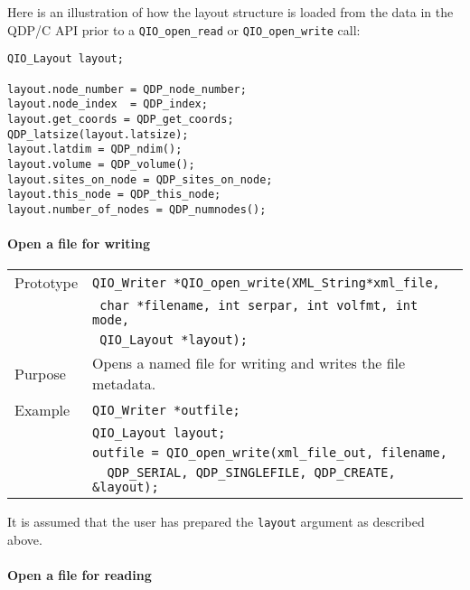 \documentclass{article}
\newcommand{\QMDhandle}{{\tt XML\_String}}
\begin{document}
Here is an illustration of how the layout structure is loaded from the
data in the QDP/C API prior to a \verb|QIO_open_read| or
\verb|QIO_open_write| call:
%
\begin{verbatim}
QIO_Layout layout;

layout.node_number = QDP_node_number;
layout.node_index  = QDP_index;
layout.get_coords = QDP_get_coords;
QDP_latsize(layout.latsize);
layout.latdim = QDP_ndim();
layout.volume = QDP_volume();
layout.sites_on_node = QDP_sites_on_node;
layout.this_node = QDP_this_node;
layout.number_of_nodes = QDP_numnodes();
\end{verbatim}

\paragraph{Open a file for writing}

\begin{flushleft}
  \begin{tabular}{|l|l|}
  \hline
  Prototype      & \verb|QIO_Writer *QIO_open_write(|\QMDhandle \verb|*xml_file,|\\
		 & \verb| char *filename, int serpar, int volfmt, int mode,| \\
                 & \verb| QIO_Layout *layout);| \\
  Purpose        & Opens a named file for writing and writes the file metadata. \\
\hline
  Example  & \verb|QIO_Writer *outfile;| \\
           & \verb|QIO_Layout layout;| \\
           & \verb|outfile = QIO_open_write(xml_file_out, filename, |\\
	   & \verb|  QDP_SERIAL, QDP_SINGLEFILE, QDP_CREATE, &layout); |\\
   \hline
 \end{tabular}
\end{flushleft}
%
It is assumed that the user has prepared the \verb|layout| argument as described above.

\paragraph{Open a file for reading}
\end{document}
